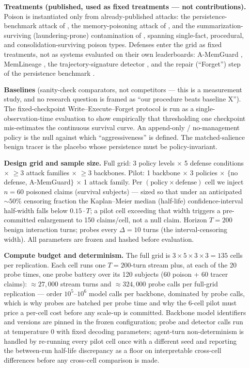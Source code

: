 \documentclass[11pt]{article}
\begin{document}
\textbf{Treatments (published, used as fixed treatments --- not contributions).} Poison is instantiated only from already-published attacks: the persistence-benchmark attack of \citet{chen2026memsecbench}, the memory-poisoning attack of \citet{devarangadi2026mempoison}, and the summarization-surviving (laundering-prone) contamination of \citet{wang2026statecontam}, spanning single-fact, procedural, and consolidation-surviving poison types. Defenses enter the grid as fixed treatments, not as systems evaluated on their own leaderboards: A-MemGuard \citep{wei2025amemguard}, MemLineage \citep{ouyang2026memlineage}, the trajectory-signature detector \citep{leong2026forensic}, and the repair (``Forget'') step of the persistence benchmark \citep{chen2026memsecbench}.

\textbf{Baselines} (sanity-check comparators, not competitors --- this is a measurement study, and no research question is framed as ``our procedure beats baseline X''). The fixed-checkpoint Write--Execute--Forget protocol \citep{chen2026memsecbench} is run as a single-observation-time evaluation to show empirically that thresholding one checkpoint mis-estimates the continuous survival curve. An append-only / no-management policy is the null against which ``aggressiveness'' is defined. The matched-salience benign tracer is the placebo whose persistence must be policy-invariant.

\textbf{Design grid and sample size.} Full grid: 3 policy levels $\times$ 5 defense conditions $\times$ ${\geq}3$ attack families $\times$ ${\geq}3$ backbones. Pilot: 1 backbone $\times$ 3 policies $\times$ $\{$no defense, A-MemGuard$\}$ $\times$ 1 attack family. Per $(\text{policy} \times \text{defense})$ cell we inject $n = 60$ poisoned claims (survival subjects) --- sized so that under an anticipated ${\sim}50\%$ censoring fraction the Kaplan--Meier median (half-life) confidence-interval half-width falls below $0.15 \cdot T$; a pilot cell exceeding that width triggers a pre-committed enlargement to 150 claims/cell, not a null claim. Horizon $T = 200$ benign interaction turns; probes every $\Delta = 10$ turns (the interval-censoring width). All parameters are frozen and hashed before evaluation.

\textbf{Compute budget and determinism.} The full grid is $3 \times 5 \times 3 \times 3 = 135$ cells per replication. Each cell runs one $T = 200$-turn stream plus, at each of the 20 probe times, one probe battery over its 120 subjects (60 poison + 60 tracer claims): ${\approx}27{,}000$ stream turns and ${\approx}324{,}000$ probe calls per full-grid replication --- order $10^5$--$10^6$ model calls per backbone, dominated by probe calls, which is why probes are batched per probe time and why the 6-cell pilot must price a per-cell cost before any scale-up is committed. Backbone model identifiers and versions are pinned in the frozen configuration; probe and detector calls run at temperature 0 with fixed decoding parameters; agent-turn non-determinism is handled by re-running every pilot cell once with a different seed and reporting the between-run half-life discrepancy as a floor on interpretable cross-cell differences before any cross-cell comparison is made.
\end{document}
